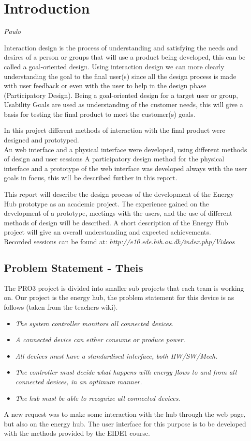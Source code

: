 \chapter{Introduction}

\textit{Paulo}

Interaction design is the process of understanding and satisfying the needs and desires of a person or groups that will use a product being developed, this can be called a goal-oriented design. Using interaction design we can more clearly understanding the goal to the final user(s) since all the design process is made with user feedback or even with the user to help in the design phase (Participatory Design). Being a goal-oriented design for a target user or group, Usability Goals are used as understanding of the customer needs, this will give a basis for testing the final product to meet the customer(s) goals.

In this project different methods of interaction with the final product were designed and prototyped.\\
An web interface and a physical interface were developed, using different methods of design and user sessions A participatory design method for the physical interface and a prototype of the web interface was developed always with the user goals in focus, this will be described further in this report.

This report will describe the design process of the development of the Energy Hub prototype as an academic project. The experience gained on the development of a prototype, meetings with the users, and the use of different methods of design will be described. A short description of the Energy Hub project will give an overall understanding and expected achievements.\\

Recorded sessions can be found at: \textit{http://e10.ede.hih.au.dk/index.php/Videos}
\section{Problem Statement - Theis}
The PRO3 project is divided into smaller sub projects that each team is working on. Our project is the energy hub, the problem statement for this device is as follows (taken from the teachers wiki).
\begin{itemize}
	\item\textit{The system controller monitors all connected devices.}
	\item\textit{A connected device can either consume or produce power.}
	\item\textit{All devices must have a standardised interface, both HW/SW/Mech.}
	\item\textit{The controller must decide what happens with energy flows to and from all connected devices, in an optimum manner.}
	\item\textit{The hub must be able to recognize all connected devices.}
\end{itemize}
A new request was to make some interaction with the hub through the web page, but also on the energy hub. The user interface for this purpose is to be developed with the methods provided by the EIDE1 course.


